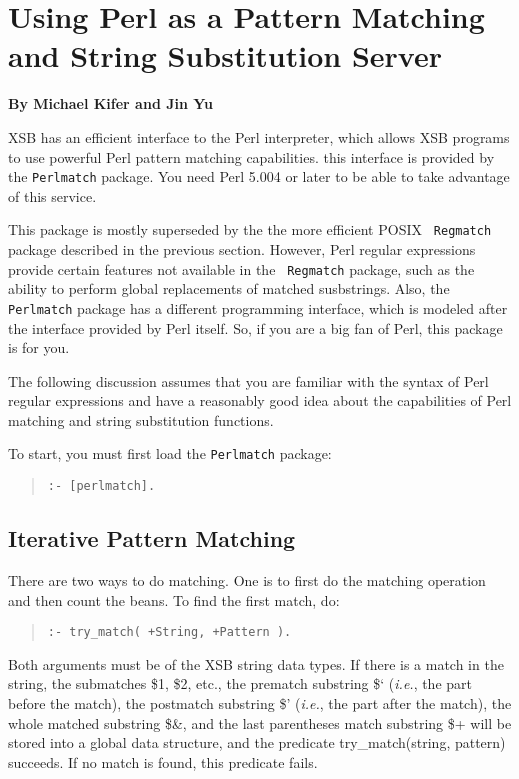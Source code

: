 \chapter{Using Perl as a Pattern Matching and String Substitution Server}

\begin{center}
{\Large {\bf By Michael Kifer and  Jin Yu }}
\end{center}

XSB has an efficient interface to the Perl interpreter, which allows XSB
programs to use powerful Perl pattern matching capabilities. this interface
is provided by the {\tt Perlmatch} package. You need Perl
5.004 or later to be able to take advantage of this service.

This package is mostly superseded by the the more efficient POSIX {\tt
  Regmatch} package described in the previous section. However, Perl
regular expressions provide certain features not available in the {\tt
  Regmatch} package, such as the ability to perform global replacements of
matched susbstrings. Also, the {\tt Perlmatch} package has a different
programming interface, which is modeled after the interface provided by
Perl itself. So, if you are a big fan of Perl, this package is for you.

The following discussion assumes that you are familiar with the syntax of
Perl regular expressions and have a reasonably good idea about the
capabilities of Perl matching and string substitution functions.

To start, you must first load the {\tt Perlmatch}  package:

\begin{quote}
 {\tt  :- [perlmatch]. }
\end{quote}

\section{Iterative Pattern Matching}
There are two ways to do matching. One is to first do the matching
operation and then count the beans. To find the first match, do:

\begin{quote}
 {\tt   :- try\_match( +String, +Pattern ). }
\end{quote}

Both arguments must be of the XSB string data types.  If there is a match
in the string, the submatches {\$}1, {\$}2, etc., the prematch substring
{\$}` ({\it i.e.}, the part before the match), the postmatch substring
{\$}' ({\it i.e.}, the part after the match), the whole matched substring
{\$}{\&}, and the last parentheses match substring {\$}+ will be stored
into a global data structure, and the predicate try\_match(string, pattern)
succeeds. If no match is found, this predicate fails.

